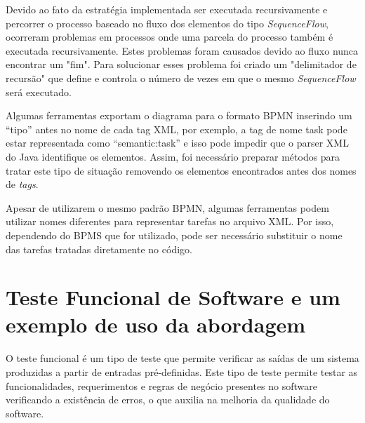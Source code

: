 \documentclass[12pt]{article}
\begin{document}

Devido ao fato da estratégia implementada ser executada recursivamente e percorrer o processo baseado no fluxo dos elementos do tipo \emph{SequenceFlow}, ocorreram problemas em processos onde uma parcela do processo também é executada recursivamente. Estes problemas foram causados devido ao fluxo nunca encontrar um "fim". Para solucionar esses problema foi criado um "delimitador de recursão" que define e controla o número de vezes em que o mesmo \emph{SequenceFlow} será executado.

Algumas ferramentas exportam o diagrama para o formato BPMN inserindo um ``tipo'' antes no nome de cada tag XML, por exemplo, a tag de nome task pode estar representada como ``semantic:task'' e isso pode impedir que o parser XML do Java identifique os elementos. Assim, foi necessário preparar métodos para tratar este tipo de situação removendo os elementos encontrados antes dos nomes de \emph{tags}.

Apesar de utilizarem o mesmo padrão BPMN, algumas ferramentas podem utilizar nomes diferentes para representar tarefas no arquivo XML. Por isso, dependendo do BPMS que for utilizado, pode ser necessário substituir o nome das tarefas tratadas diretamente no código.




\section{Teste Funcional de Software e um exemplo de uso da abordagem}
O teste funcional é um tipo de teste que permite verificar as saídas de um sistema produzidas a partir de entradas pré-definidas. Este tipo de teste permite testar as funcionalidades, requerimentos e regras de negócio presentes no software\cite{molinari2003testes} verificando a existência de erros, o que auxilia na melhoria da qualidade do software.
\end{document}
